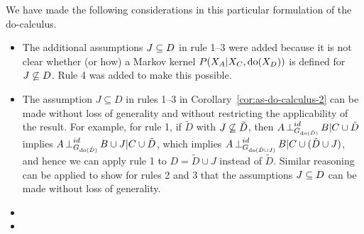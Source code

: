 \begin{Rem}
  We have made the following considerations in this particular formulation of the do-calculus.
  \begin{itemize}
    \item The additional assumptions $J \subseteq D$ in rule 1--3 were added because it is not clear whether (or how) a Markov kernel $P(X_A|X_C,\operatorname{do}(X_{D}))$ is defined for $J \not\subseteq D$. 
      Rule 4 was added to make this possible.
    \item The assumption $J \subseteq D$ in rules 1--3 in Corollary~\ref{cor:as-do-calculus-2} can be made without loss of generality and without restricting the applicability of the result. For example, for rule 1, if $\tilde D$ with $J \not\subseteq \tilde D$, then $A \operatorname*{\perp}^{id}_{G_{\operatorname{do}(\tilde D)}} B | C \cup \tilde D$ implies $A \operatorname*{\perp}^{id}_{G_{\operatorname{do}(\tilde D)}} B \cup J | C \cup \tilde D$, which implies $A \operatorname*{\perp}^{id}_{G_{\operatorname{do}(\tilde D \cup J)}} B | C \cup (\tilde D \cup J)$, and hence we can apply rule 1 to $D = \tilde D \cup J$ instead of $\tilde D$.
      Similar reasoning can be applied to show for rules 2 and 3 that the assumptions $J \subseteq D$ can be made without loss of generality.
    \item {}
    \item {}
  \end{itemize}
\end{Rem}


